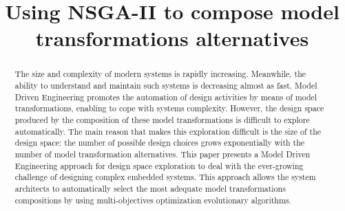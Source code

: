\documentclass[conference]{IEEEtran}
\begin{document}
\title{Using NSGA-II to compose model transformations alternatives }

 \author{



}

\maketitle

\begin{abstract}
The size and complexity of modern systems is rapidly increasing. Meanwhile, the ability to understand and maintain such systems is decreasing almost as fast.
Model Driven Engineering promotes the automation of design activities by means of model transformations, enabling to cope with systems complexity. However, the design space produced by the composition of these model transformations is difficult to explore automatically. The main reason that makes this exploration difficult is the size of the design space: the number of possible design choices grows exponentially with the number of model transformation alternatives.
This paper presents a Model Driven Engineering approach for design space exploration to deal with the ever-growing challenge of designing complex embedded systems. This approach allows the system architects to automatically select the most adequate model transformations compositions by using multi-objectives optimization evolutionary algorithms.

\end{abstract}
\end{document}
